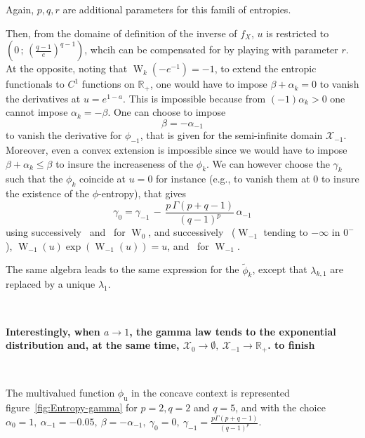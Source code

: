 \documentclass[entropy,article,submit,moreauthors,pdftex]{Definitions/mdpi}
\newcommand{\SZ}[1]{{\color{blue} #1}}                                       %
\newcommand{\Avoir}[1]{{\color{red}\bf #1}}                                  %
\def\Rset{\mathbb{R}}%
\def\X{\mathcal{X}}%
\def\W{\operatorname{W}} %
\def\u{\mathrm{u}}
\begin{document}
\SZ{Again, $p, q, r$ are additional parameters for this famili of entropies.

  Then,  from  the  domaine of  definition  of  the  inverse  of $f_X$,  $u$  is
  restricted to $\left(  0 \, ; \, \left(  \frac{q-1}{e} \right)^{q-1} \right)$,
  whcih can be compensated for by  playing with parameter $r$.  At the opposite,
  noting  that  $\W_k\left(  -e^{-1}  \right)  = -1$,  to  extend  the  entropic
  functionals to $C^1$ functions on $\Rset_+$, one would have to impose $\beta +
  \alpha_k = 0$ to  vanish the derivatives at $u =  e^{1-a}$. This is impossible
  because from $(-1) \alpha_k > 0$ one  cannot impose $\alpha_k = - \beta$.  One
  can choose  to impose $$\beta =  - \alpha_{-1}$$ to vanish  the derivative for
  $\phi_{-1}$, that is  given for the semi-infinite  domain $\X_{-1}$. Moreover,
  even a convex extension  is impossible since we would have  to impose $\beta +
  \alpha_k  \le \beta$  to  insure the  increaseness of  the  $\phi_k$.  We  can
  however choose the $\gamma_k$  such that the $\phi_k$ coincide at  $u = 0$ for
  instance  (e.g.,  to  vanish them  at  $0$  to  insure  the existence  of  the
  $\phi$-entropy), that gives
%
\[
\gamma_0  = \gamma_{-1} \, -  \, \frac{p \, \Gamma(p+q-1)}{(q-1)^p} \,
\alpha_{-1}
\]
%
using successively~\cite[Eq.~3.1]{CorGon96}  and~\cite[Eq.~13.1.2]{AbrSte70} for
$\W_0$,  and  successively~\cite[Eq.~13.1.4]{AbrSte70}   ($\W_{-1}$  tending  to
$-\infty$ in  $0^{-}$), $\W_{-1}(u) \exp(\W_{-1}(u)) =  u$, and~\cite[Eq.~4.6 \&
  lines that  follow]{CorGon96} for  $\W_{-1}$.
}

The  same algebra  leads to  the same  expression for  the $\widetilde{\phi}_k$,
except that $\lambda_{k,1}$ are replaced by a unique $\lambda_1$.

\


\Avoir{Interestingly, when $a \to 1$, the gamma law tends to the exponential distribution and, at the same time, $\X_0 \to \emptyset, \: \X_{-1} \to \Rset_+$. to finish}

\

The  multivalued  function  $\phi_\u$  in the  concave  context  is  represented
figure~\ref{fig:Entropy-gamma} for  $p = 2,  q =  2$ and $q  = 5$, and  with the
choice \SZ{$\alpha_0 = 1,  \: \alpha_{-1} = -0.05, \: \beta  = - \alpha_{-1}, \:
  \gamma_0 = 0, \: \gamma_{-1} = \frac{p \Gamma(p+q-1)}{(q-1)^p}$}.
\end{document}
